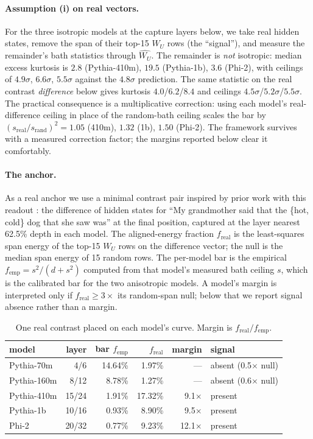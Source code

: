 \documentclass[11pt]{article}
\newcommand{\WU}{W_U}
\begin{document}
\paragraph{Assumption (i) on real vectors.} For the three isotropic
models at the capture layers below, we take real hidden states,
remove the span of their top-15 $\WU$ rows (the ``signal''), and
measure the remainder's bath statistics through $\hat{\WU}$. The
remainder is \emph{not} isotropic: median excess kurtosis is $2.8$
(Pythia-410m), $19.5$ (Pythia-1b), $3.6$ (Phi-2), with ceilings of
$4.9\sigma$, $6.6\sigma$, $5.5\sigma$ against the $4.8\sigma$
prediction. The same statistic on the real contrast \emph{difference}
below gives kurtosis $4.0$/$6.2$/$8.4$ and ceilings
$4.5\sigma$/$5.2\sigma$/$5.5\sigma$. The practical consequence is a
multiplicative correction: using each model's real-difference ceiling
in place of the random-bath ceiling scales the bar by
$(s_{\text{real}}/s_{\text{rand}})^2 = 1.05$ (410m), $1.32$ (1b),
$1.50$ (Phi-2). The framework survives with a measured correction
factor; the margins reported below clear it comfortably.

\paragraph{The anchor.} As a real anchor we use a minimal contrast
pair inspired by prior work with this readout
\citep{tuomi2026contrastive}: the difference of hidden
states for ``My grandmother said that the \{hot, cold\} dog that she
saw was'' at the final position, captured at the layer nearest 62.5\%
depth in each model. The aligned-energy fraction $f_{\text{real}}$ is
the least-squares span energy of the top-15 $\WU$ rows on the
difference vector; the null is the median span energy of 15 random
rows. The per-model bar is the empirical
$f_{\text{emp}} = s^2/(d + s^2)$ computed from that model's measured
bath ceiling $s$, which is the calibrated bar for the two anisotropic
models. A model's margin is interpreted only if
$f_{\text{real}} \geq 3\times$ its random-span null; below that we
report signal absence rather than a margin.

\begin{table}[t]
\centering
\small
\begin{tabular}{lrrrrl}
\toprule
model & layer & bar $f_{\text{emp}}$ & $f_{\text{real}}$ & margin &
signal \\
\midrule
Pythia-70m & 4/6 & 14.64\% & 1.97\% & --- & absent (0.5$\times$ null) \\
Pythia-160m & 8/12 & 8.78\% & 1.27\% & --- & absent (0.6$\times$ null) \\
Pythia-410m & 15/24 & 1.91\% & 17.32\% & 9.1$\times$ & present \\
Pythia-1b & 10/16 & 0.93\% & 8.90\% & 9.5$\times$ & present \\
Phi-2 & 20/32 & 0.77\% & 9.23\% & 12.1$\times$ & present \\
\bottomrule
\end{tabular}
\caption{One real contrast placed on each model's curve. Margin is
$f_{\text{real}}/f_{\text{emp}}$.}
\label{tab:anchor}
\end{table}
\end{document}
